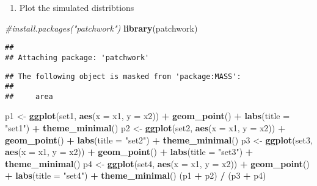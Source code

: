 \documentclass[
]{article}
\newenvironment{Shaded}{\begin{snugshade}}{\end{snugshade}}
\newcommand{\AttributeTok}[1]{\textcolor[rgb]{0.13,0.29,0.53}{#1}}
\newcommand{\CommentTok}[1]{\textcolor[rgb]{0.56,0.35,0.01}{\textit{#1}}}
\newcommand{\FunctionTok}[1]{\textcolor[rgb]{0.13,0.29,0.53}{\textbf{#1}}}
\newcommand{\NormalTok}[1]{#1}
\newcommand{\OtherTok}[1]{\textcolor[rgb]{0.56,0.35,0.01}{#1}}
\newcommand{\SpecialCharTok}[1]{\textcolor[rgb]{0.81,0.36,0.00}{\textbf{#1}}}
\newcommand{\StringTok}[1]{\textcolor[rgb]{0.31,0.60,0.02}{#1}}
\providecommand{\tightlist}{%
  \setlength{\itemsep}{0pt}\setlength{\parskip}{0pt}}
\begin{document}
\begin{enumerate}
\def\labelenumi{\alph{enumi})}
\setcounter{enumi}{1}
\tightlist
\item
  Plot the simulated distribtions
\end{enumerate}

\begin{Shaded}
\begin{Highlighting}[]
\CommentTok{\#install.packages("patchwork")}
\FunctionTok{library}\NormalTok{(patchwork)}
\end{Highlighting}
\end{Shaded}

\begin{verbatim}
## 
## Attaching package: 'patchwork'
\end{verbatim}

\begin{verbatim}
## The following object is masked from 'package:MASS':
## 
##     area
\end{verbatim}

\begin{Shaded}
\begin{Highlighting}[]
\NormalTok{p1 }\OtherTok{\textless{}{-}} \FunctionTok{ggplot}\NormalTok{(set1, }\FunctionTok{aes}\NormalTok{(}\AttributeTok{x =}\NormalTok{ x1, }\AttributeTok{y =}\NormalTok{ x2)) }\SpecialCharTok{+} \FunctionTok{geom\_point}\NormalTok{() }\SpecialCharTok{+} \FunctionTok{labs}\NormalTok{(}\AttributeTok{title =} \StringTok{"set1"}\NormalTok{) }\SpecialCharTok{+} \FunctionTok{theme\_minimal}\NormalTok{()}
\NormalTok{p2 }\OtherTok{\textless{}{-}} \FunctionTok{ggplot}\NormalTok{(set2, }\FunctionTok{aes}\NormalTok{(}\AttributeTok{x =}\NormalTok{ x1, }\AttributeTok{y =}\NormalTok{ x2)) }\SpecialCharTok{+} \FunctionTok{geom\_point}\NormalTok{() }\SpecialCharTok{+} \FunctionTok{labs}\NormalTok{(}\AttributeTok{title =} \StringTok{"set2"}\NormalTok{) }\SpecialCharTok{+} \FunctionTok{theme\_minimal}\NormalTok{()}
\NormalTok{p3 }\OtherTok{\textless{}{-}} \FunctionTok{ggplot}\NormalTok{(set3, }\FunctionTok{aes}\NormalTok{(}\AttributeTok{x =}\NormalTok{ x1, }\AttributeTok{y =}\NormalTok{ x2)) }\SpecialCharTok{+} \FunctionTok{geom\_point}\NormalTok{() }\SpecialCharTok{+} \FunctionTok{labs}\NormalTok{(}\AttributeTok{title =} \StringTok{"set3"}\NormalTok{) }\SpecialCharTok{+} \FunctionTok{theme\_minimal}\NormalTok{()}
\NormalTok{p4 }\OtherTok{\textless{}{-}} \FunctionTok{ggplot}\NormalTok{(set4, }\FunctionTok{aes}\NormalTok{(}\AttributeTok{x =}\NormalTok{ x1, }\AttributeTok{y =}\NormalTok{ x2)) }\SpecialCharTok{+} \FunctionTok{geom\_point}\NormalTok{() }\SpecialCharTok{+} \FunctionTok{labs}\NormalTok{(}\AttributeTok{title =} \StringTok{"set4"}\NormalTok{) }\SpecialCharTok{+} \FunctionTok{theme\_minimal}\NormalTok{()}
\NormalTok{(p1 }\SpecialCharTok{+}\NormalTok{ p2) }\SpecialCharTok{/}\NormalTok{ (p3 }\SpecialCharTok{+}\NormalTok{ p4)}
\end{Highlighting}
\end{Shaded}
\end{document}
